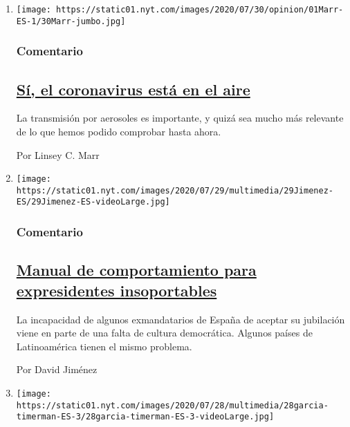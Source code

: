 \begin{enumerate}
\def\labelenumi{\arabic{enumi}.}
\item
  \texttt{[image: https://static01.nyt.com/images/2020/07/30/opinion/01Marr-ES-1/30Marr-jumbo.jpg]}

  \hypertarget{comentario}{%
  \subsubsection{Comentario}\label{comentario}}

  \hypertarget{suxed-el-coronavirus-estuxe1-en-el-aire}{%
  \subsection{\texorpdfstring{\href{/es/2020/08/01/espanol/opinion/coronavirus-aire.html}{Sí,
  el coronavirus está en el
  aire}}{Sí, el coronavirus está en el aire}}\label{suxed-el-coronavirus-estuxe1-en-el-aire}}

  La transmisión por aerosoles es importante, y quizá sea mucho más
  relevante de lo que hemos podido comprobar hasta ahora.

  Por Linsey C. Marr
\item
  \texttt{[image: https://static01.nyt.com/images/2020/07/29/multimedia/29Jimenez-ES/29Jimenez-ES-videoLarge.jpg]}

  \hypertarget{comentario-1}{%
  \subsubsection{Comentario}\label{comentario-1}}

  \hypertarget{manual-de-comportamiento-para-expresidentes-insoportables}{%
  \subsection{\texorpdfstring{\href{/es/2020/07/29/espanol/opinion/espana-felipe-gonzalez-jose-maria-aznar.html}{Manual
  de comportamiento para expresidentes
  insoportables}}{Manual de comportamiento para expresidentes insoportables}}\label{manual-de-comportamiento-para-expresidentes-insoportables}}

  La incapacidad de algunos exmandatarios de España de aceptar su
  jubilación viene en parte de una falta de cultura democrática. Algunos
  países de Latinoamérica tienen el mismo problema.

  Por David Jiménez
\item
  \texttt{[image: https://static01.nyt.com/images/2020/07/28/multimedia/28garcia-timerman-ES-3/28garcia-timerman-ES-3-videoLarge.jpg]}


\end{enumerate}
